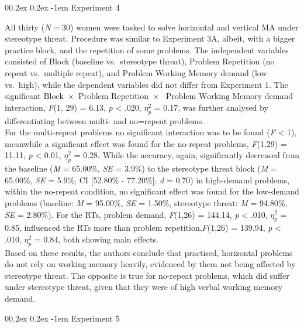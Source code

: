 \documentclass[
  stu,floatsintext]{apa7}
\makeatletter
\let\oldparagraph\paragraph
\renewcommand{\paragraph}[1]{\oldparagraph{#1}\mbox{}}
\renewcommand{\paragraph}{\@startsection{paragraph}{4}{\parindent}%
  {0\baselineskip \@plus 0.2ex \@minus 0.2ex}%
  {-1em}%
  {\normalfont\normalsize\bfseries\itshape\typesectitle}}
\renewcommand{\paragraph}{\@startsection{paragraph}{4}{\parindent}%
  {0\baselineskip \@plus 0.2ex \@minus 0.2ex}%
  {-1em}%
  {\normalfont\normalsize\bfseries\typesectitle}}
\makeatother
\begin{document}
\paragraph{Experiment 4}\label{experiment-4}

All thirty (\(N = 30\)) women were tasked to solve horizontal and vertical MA under stereotype threat.
Procedure was similar to Experiment 3A, albeit, with a bigger practice block, and the repetition of some problems.
The independent variables consisted of Block (baseline vs.~stereotype threat), Problem Repetition (no repeat vs.~multiple repeat), and Problem Working Memory demand (low vs.~high), while the dependent variables did not differ from Experiment 1.
The significant \(\text{Block } \times \text{ Problem Repetition } \times\) \(\text{ Problem Working Memory demand }\) interaction, \emph{F}(1, 29) = 6.13, \emph{p} \textless{} .020, \(\eta^{2}_{p}\) = 0.17, was further analysed by differentiating between multi- and no=repeat problems.\\
For the multi-repeat problems no significant interaction was to be found (\emph{F} \textless{} 1), meanwhile a significant effect was found for the no-repeat problems, \emph{F}(1,29) = 11.11, \emph{p} \textless{} 0.01, \(\eta^{2}_{p}\) = 0.28.
While the accuracy, again, significantly decreased from the baseline (\emph{M} = 65.00\%, \emph{SE} = 3.9\%) to the stereotype threat block (\emph{M} = 65.00\%, \emph{SE} = 5.9\%; CI {[}52.80\% - 77.20\%{]}; \emph{d} = 0.70) in high-demand problems, within the no-repeat condition, no significant effect was found for the low-demand problems (baseline: \emph{M} = 95.00\%, \emph{SE} = 1.50\%, stereotype threat: \emph{M} = 94.80\%, \emph{SE} = 2.80\%).
For the RTs, problem demand, \emph{F}(1,26) = 144.14, \emph{p} \textless{} .010, \(\eta^{2}_{p}\) = 0.85, influenced the RTs more than problem repetition,\emph{F}(1,26) = 139.94, \emph{p} \textless{} .010, \(\eta^{2}_{p}\) = 0.84, both showing main effects.\\
Based on these results, the authors conclude that practised, horizontal problems do not rely on working memory heavily, evidenced by them not being affected by stereotype threat.
The opposite is true for no-repeat problems, which did suffer under stereotype threat, given that they were of high verbal working memory demand.

\paragraph{Experiment 5}\label{experiment-5}
\end{document}
